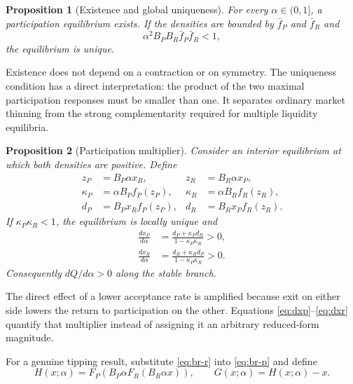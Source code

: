 \documentclass[11pt]{article}
\newtheorem{proposition}{Proposition}
\begin{document}
\begin{proposition}[Existence and global uniqueness]\label{prop:existence}
For every $\alpha\in(0,1]$, a participation equilibrium exists. If the
densities are bounded by $\bar f_P$ and $\bar f_R$ and
\begin{equation}
\alpha^2B_PB_R\bar f_P\bar f_R<1, \label{eq:global-contraction}
\end{equation}
the equilibrium is unique.
\end{proposition}

Existence does not depend on a contraction or on symmetry. The uniqueness
condition has a direct interpretation: the product of the two maximal
participation responses must be smaller than one. It separates ordinary market
thinning from the strong complementarity required for multiple liquidity
equilibria.

\begin{proposition}[Participation multiplier]\label{prop:comparative-statics}
Consider an interior equilibrium at which both densities are positive. Define
\begin{align*}
z_P&=B_P\alpha x_R,&
z_R&=B_R\alpha x_P,\\
\kappa_P&=\alpha B_Pf_P(z_P),&
\kappa_R&=\alpha B_Rf_R(z_R),\\
d_P&=B_Px_Rf_P(z_P),&
d_R&=B_Rx_Pf_R(z_R).
\end{align*}
If $\kappa_P\kappa_R<1$, the equilibrium is locally unique and
\begin{align}
\frac{dx_P}{d\alpha}
&=\frac{d_P+\kappa_Pd_R}{1-\kappa_P\kappa_R}>0,
\label{eq:dxp}\\
\frac{dx_R}{d\alpha}
&=\frac{d_R+\kappa_Rd_P}{1-\kappa_P\kappa_R}>0.
\label{eq:dxr}
\end{align}
Consequently $dQ/d\alpha>0$ along the stable branch.
\end{proposition}

The direct effect of a lower acceptance rate is amplified because exit on
either side lowers the return to participation on the other. Equations
\eqref{eq:dxp}--\eqref{eq:dxr} quantify that multiplier instead of assigning it
an arbitrary reduced-form magnitude.

For a genuine tipping result, substitute \eqref{eq:br-r} into
\eqref{eq:br-p} and define
\begin{equation}
H(x;\alpha)
=F_P\!\left(B_P\alpha F_R(B_R\alpha x)\right),\qquad
G(x;\alpha)=H(x;\alpha)-x. \label{eq:composed-br}
\end{equation}
\end{document}
